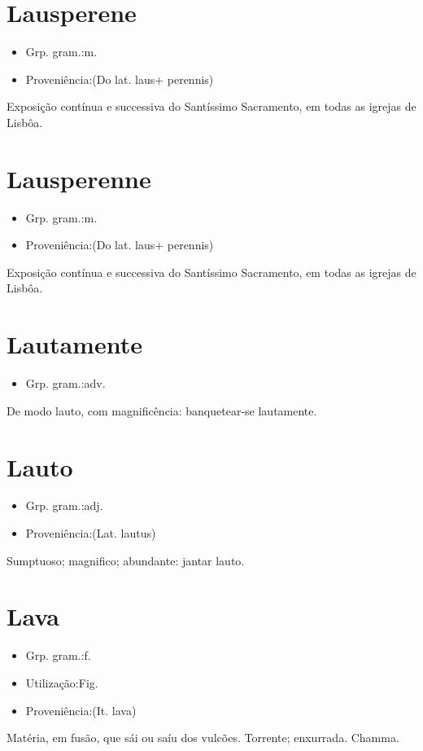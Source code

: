 \section{Lausperene}
\begin{itemize}
\item {Grp. gram.:m.}
\end{itemize}
\begin{itemize}
\item {Proveniência:(Do lat. \textunderscore laus\textunderscore  + \textunderscore perennis\textunderscore )}
\end{itemize}
Exposição contínua e successiva do Santíssimo Sacramento, em todas as igrejas de Lisbôa.
\section{Lausperenne}
\begin{itemize}
\item {Grp. gram.:m.}
\end{itemize}
\begin{itemize}
\item {Proveniência:(Do lat. \textunderscore laus\textunderscore  + \textunderscore perennis\textunderscore )}
\end{itemize}
Exposição contínua e successiva do Santíssimo Sacramento, em todas as igrejas de Lisbôa.
\section{Lautamente}
\begin{itemize}
\item {Grp. gram.:adv.}
\end{itemize}
De modo lauto, com magnificência: \textunderscore banquetear-se lautamente\textunderscore .
\section{Lauto}
\begin{itemize}
\item {Grp. gram.:adj.}
\end{itemize}
\begin{itemize}
\item {Proveniência:(Lat. \textunderscore lautus\textunderscore )}
\end{itemize}
Sumptuoso; magnifico; abundante: \textunderscore jantar lauto\textunderscore .
\section{Lava}
\begin{itemize}
\item {Grp. gram.:f.}
\end{itemize}
\begin{itemize}
\item {Utilização:Fig.}
\end{itemize}
\begin{itemize}
\item {Proveniência:(It. \textunderscore lava\textunderscore )}
\end{itemize}
Matéria, em fusão, que sái ou saíu dos vulcões.
Torrente; enxurrada.
Chamma.
